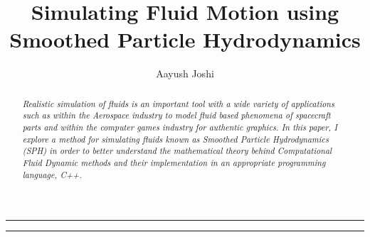 \documentclass[a4paper,11pt]{article}
\title{\textbf{Simulating Fluid Motion using Smoothed Particle Hydrodynamics}}
\author{Aayush Joshi}
\date{}
\begin{document}
\maketitle

\par\noindent\rule{\textwidth}{0.3pt}

\begin{abstract}
\noindent \textit{Realistic simulation of fluids is an important tool with a wide variety of applications such as within the Aerospace industry to model fluid based phenomena of spacecraft parts and within the computer games industry for authentic graphics. In this paper, I explore a method for simulating fluids known as Smoothed Particle Hydrodynamics (SPH) in order to better understand the mathematical theory behind Computational Fluid Dynamic methods and their implementation in an appropriate programming language, C++.}
\end{abstract}

\par\noindent\rule{\textwidth}{0.3pt}
\tableofcontents
\newpage
\begin{multicols}{2}

\pagebreak

\pagebreak

\pagebreak

\pagebreak

\pagebreak

\newpage
\nocite{*}

\end{multicols}

\end{document}
